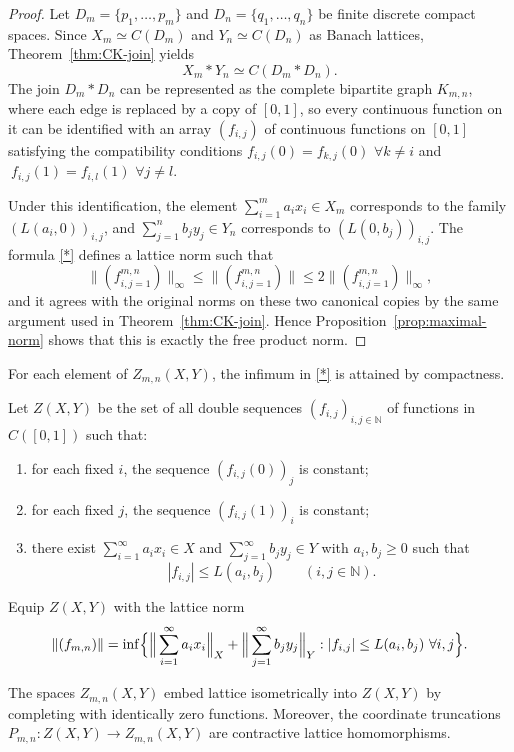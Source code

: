 \documentclass[12pt]{amsart}
\theoremstyle{plain}
\theoremstyle{definition}
\begin{document}
\begin{proof}
Let $D_m=\{p_1,\dots,p_m\}$ and $D_n=\{q_1,\dots,q_n\}$ be finite discrete compact spaces. Since $X_m\simeq C(D_m)$ and $Y_n\simeq C(D_n)$ as Banach lattices, Theorem~\ref{thm:CK-join} yields
\[
X_m\ast Y_n\simeq C(D_m\ast D_n).
\]
The join $D_m\ast D_n$ can be represented as the complete bipartite graph $K_{m,n}$, where each edge is replaced by a copy of $[0,1]$, so every continuous function on it can be identified with an array $(f_{i,j})$ of continuous functions on $[0,1]$ satisfying the compatibility conditions $f_{i,j}(0)=f_{k,j}(0)$ $\forall k\neq i$ and $\ f_{i,j}(1)=f_{i,l}(1)$ $\forall j\neq l $.

Under this identification, the element $\sum_{i=1}^m a_i x_i\in X_m$ corresponds to the family $(L(a_i,0))_{i,j}$, and $\sum_{j=1}^n b_j y_j\in Y_n$ corresponds to $(L(0,b_j))_{i,j}$. The formula \eqref{*} defines a lattice norm such that 
\[
\|(f_{i,j=1}^{m,n})\|_\infty\leq\|(f_{i,j=1}^{m,n})\|\leq2\|(f_{i,j=1}^{m,n})\|_\infty,
\]
and it agrees with the original norms on these two canonical copies by the same argument used in Theorem~\ref{thm:CK-join}. Hence Proposition~\ref{prop:maximal-norm} shows that this is exactly the free product norm.
\end{proof}

For each element of $Z_{m,n}(X,Y)$, the infimum in \eqref{*} is attained by compactness.

Let $Z(X,Y)$ be the set of all double sequences $(f_{i,j})_{i,j\in\mathbb N }$ of functions in $C([0,1])$ such that:
\begin{enumerate}
\item for each fixed $i$, the sequence $(f_{i,j}(0))_j$ is constant;
\item for each fixed $j$, the sequence $(f_{i,j}(1))_i$ is constant;
\item there exist $\sum_{i=1}^\infty a_i x_i\in X$ and $\sum_{j=1}^\infty b_j y_j\in Y$ with $a_i,b_j\geq 0$ such that
\[
|f_{i,j}|\leq L(a_i,b_j)
\qquad (i,j\in \mathbb{N}).
\]
\end{enumerate}
Equip $Z(X,Y)$ with the lattice norm
\[
\|(f_{m,n})\|
=
\inf\Bigl\{
\Big\|\sum_{i=1}^\infty a_i x_i\Big\|_X+\Big\|\sum_{j=1}^\infty b_j y_j\Big\|_Y:
|f_{i,j}|\leq L(a_i,b_j)\ \forall i,j
\Bigr\}.
\]

The spaces $Z_{m,n}(X,Y)$ embed lattice isometrically into $Z(X,Y)$ by completing with identically zero functions. Moreover, the coordinate truncations $P_{m,n}:Z(X,Y)\to Z_{m,n}(X,Y)$ are contractive lattice homomorphisms.
\end{document}
